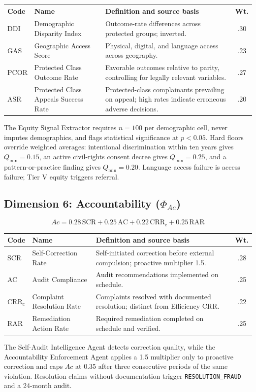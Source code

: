\begin{center}
\begin{tabular}{p{1.4cm}p{4cm}p{6.7cm}c}
\toprule
Code & Name & Definition and source basis & Wt. \\
\midrule
DDI & Demographic Disparity Index & Outcome-rate differences across protected groups; inverted. & .30 \\
GAS & Geographic Access Score & Physical, digital, and language access across geography. & .23 \\
PCOR & Protected Class Outcome Rate & Favorable outcomes relative to parity, controlling for legally relevant variables. & .27 \\
ASR & Protected Class Appeals Success Rate & Protected-class complainants prevailing on appeal; high rates indicate erroneous adverse decisions. & .20 \\
\bottomrule
\end{tabular}
\end{center}

The Equity Signal Extractor requires \(n=100\) per demographic cell, never
imputes demographics, and flags statistical significance at \(p<0.05\). Hard
floors override weighted averages: intentional discrimination within ten
years gives \(Q_{\min}=0.15\), an active civil-rights consent decree gives
\(Q_{\min}=0.25\), and a pattern-or-practice finding gives \(Q_{\min}=0.20\).
Language access failure is access failure; Tier V equity triggers referral.

\subsection{Dimension 6: Accountability (\(\Phi_{Ac}\))}

\[
Ac = 0.28\,\mathrm{SCR}+0.25\,\mathrm{AC}+0.22\,\mathrm{CRR_c}+0.25\,\mathrm{RAR}
\]

\begin{center}
\begin{tabular}{p{1.4cm}p{4cm}p{6.7cm}c}
\toprule
Code & Name & Definition and source basis & Wt. \\
\midrule
SCR & Self-Correction Rate & Self-initiated correction before external compulsion; proactive multiplier 1.5. & .28 \\
AC & Audit Compliance & Audit recommendations implemented on schedule. & .25 \\
CRR$_c$ & Complaint Resolution Rate & Complaints resolved with documented resolution; distinct from Efficiency CRR. & .22 \\
RAR & Remediation Action Rate & Required remediation completed on schedule and verified. & .25 \\
\bottomrule
\end{tabular}
\end{center}

The Self-Audit Intelligence Agent detects correction quality, while the
Accountability Enforcement Agent applies a 1.5 multiplier only to proactive
correction and caps \(Ac\) at 0.35 after three consecutive periods of the same
violation. Resolution claims without documentation trigger
\texttt{RESOLUTION\_FRAUD} and a 24-month audit.
